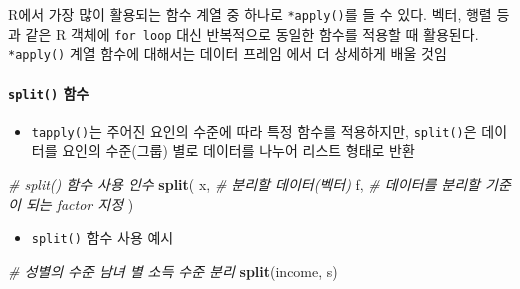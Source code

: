 \documentclass[
  11pt,
]{krantz}
\makeatletter
\newenvironment{Shaded}{\begin{snugshade}}{\end{snugshade}}
\newcommand{\CommentTok}[1]{\textcolor[rgb]{0.37,0.37,0.37}{\textit{#1}}}
\newcommand{\KeywordTok}[1]{\textcolor[rgb]{0.27,0.27,0.27}{\textbf{#1}}}
\newcommand{\NormalTok}[1]{#1}
\providecommand{\tightlist}{%
  \setlength{\itemsep}{0pt}\setlength{\parskip}{0pt}}
\newenvironment{kframe}{%
\medskip{}
\setlength{\fboxsep}{.8em}
 \def\at@end@of@kframe{}%
 \ifinner\ifhmode%
  \def\at@end@of@kframe{\end{minipage}}%
  \begin{minipage}{\columnwidth}%
 \fi\fi%
 \def\FrameCommand##1{\hskip\@totalleftmargin \hskip-\fboxsep
 \colorbox{shadecolor}{##1}\hskip-\fboxsep
     \hskip-\linewidth \hskip-\@totalleftmargin \hskip\columnwidth}%
 \MakeFramed {\advance\hsize-\width
   \@totalleftmargin\z@ \linewidth\hsize
   \@setminipage}}%
 {\par\unskip\endMakeFramed%
 \at@end@of@kframe}
\newenvironment{rmdblock}[1]
  {
  \begin{itemize}
  \renewcommand{\labelitemi}{
    \raisebox{-.7\height}[0pt][0pt]{
      {\setkeys{Gin}{width=3em,keepaspectratio}\texttt{[image: images/\#1]}}
    }
  }
  \setlength{\fboxsep}{1em}
  \begin{kframe}
  \item
  }
  {
  \end{kframe}
  \end{itemize}
  }
\newenvironment{rmdnote}
  {\begin{rmdblock}{note}}
  {\end{rmdblock}}
\makeatother
\begin{document}
\normalsize

\footnotesize

\begin{rmdnote}
\begin{rmdnote}

R에서 가장 많이 활용되는 함수 계열 중 하나로 \texttt{*apply()}를 들 수 있다. 벡터, 행렬 등과 같은 R 객체에 \texttt{for\ loop} 대신 반복적으로 동일한 함수를 적용할 때 활용된다. \texttt{*apply()} 계열 함수에 대해서는 데이터 프레임 에서 더 상세하게 배울 것임

\end{rmdnote}
\end{rmdnote}

\normalsize

\hypertarget{split}{%
\paragraph{\texorpdfstring{\texttt{split()} 함수}{split() 함수}}\label{split}}

\begin{itemize}
\tightlist
\item
  \texttt{tapply()}는 주어진 요인의 수준에 따라 특정 함수를 적용하지만, \texttt{split()}은 데이터를 요인의 수준(그룹) 별로 데이터를 나누어 리스트 형태로 반환
\end{itemize}

\footnotesize

\begin{Shaded}
\begin{Highlighting}[]
\CommentTok{# split() 함수 사용 인수}
\KeywordTok{split}\NormalTok{(}
\NormalTok{  x, }\CommentTok{# 분리할 데이터(벡터)}
\NormalTok{  f, }\CommentTok{# 데이터를 분리할 기준이 되는 factor 지정}
\NormalTok{)}
\end{Highlighting}
\end{Shaded}

\normalsize

\begin{itemize}
\tightlist
\item
  \texttt{split()} 함수 사용 예시
\end{itemize}

\footnotesize

\begin{Shaded}
\begin{Highlighting}[]
\CommentTok{# 성별의 수준 남녀 별 소득 수준 분리}
\KeywordTok{split}\NormalTok{(income, s)}
\end{Highlighting}
\end{Shaded}
\end{document}
